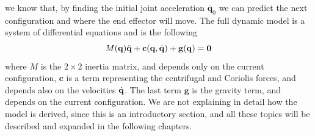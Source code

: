 \documentclass[10pt, a4paper]{report}
\begin{document}
we know that, by finding the initial joint acceleration $\ddot{\mathbf q_0}$ we can predict the next configuration and where the end effector will move. The full dynamic model is a system of differential equations and is the following\begin{equation}
    M(\mathbf q)\ddot{\mathbf q}+\mathbf c(\mathbf q,{\dot{\mathbf q}})+\mathbf g(\mathbf q)=\mathbf 0
\end{equation} 
where $M$ is the  $2\times 2$ inertia matrix, and depends only on the current configuration, $\mathbf c$ is a term representing the centrifugal and Coriolis forces, and depends also on the velocities ${\dot{\mathbf q}}$. The last term $\mathbf g$ is the gravity term, and depends on the current configuration. We are not explaining in detail how the model is derived, since this is an introductory section, and all these topics will be described and expanded in the following chapters.  
\end{document}
